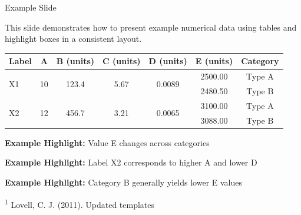 \begin{frame}{Example Slide}
\footnotesize

This slide demonstrates how to present example numerical data using tables and highlight boxes in a consistent layout.

\insertpause

\begin{table}[H]
\renewcommand{\arraystretch}{1.4}
\centering
\begin{tabular}{|l|c|c|c|c|c|c|}
\hline
Label & A & B (units) & C (units) & D (units) & E (units) & Category \\
\hline
\multirow{2}{*}{X1} & \multirow{2}{*}{10} & \multirow{2}{*}{123.4} & \multirow{2}{*}{5.67} & \multirow{2}{*}{0.0089} & 2500.00 & Type A \\
                    &                     &                        &                       &                          & 2480.50 & Type B \\
\hline
\multirow{2}{*}{X2} & \multirow{2}{*}{12} & \multirow{2}{*}{456.7} & \multirow{2}{*}{3.21} & \multirow{2}{*}{0.0065} & 3100.00 & Type A \\
                    &                     &                        &                       &                          & 3088.00 & Type B \\
\hline
\end{tabular}
\end{table}

\insertpause
\begin{highlightbox}
\centering
\textbf{Example Highlight:} Value E changes across categories
\end{highlightbox}

\insertpause
\begin{highlightbox}
\centering
\textbf{Example Highlight:} Label X2 corresponds to higher A and lower D
\end{highlightbox}

\insertpause
\begin{highlightbox}
\centering
\textbf{Example Highlight:} Category B generally yields lower E values \citep{Lovell:2011:updated}
\end{highlightbox}

\tiny
\vfill
\vspace{-2mm}
\textsuperscript{1} Lovell, C. J. (2011). Updated templates

\end{frame}
